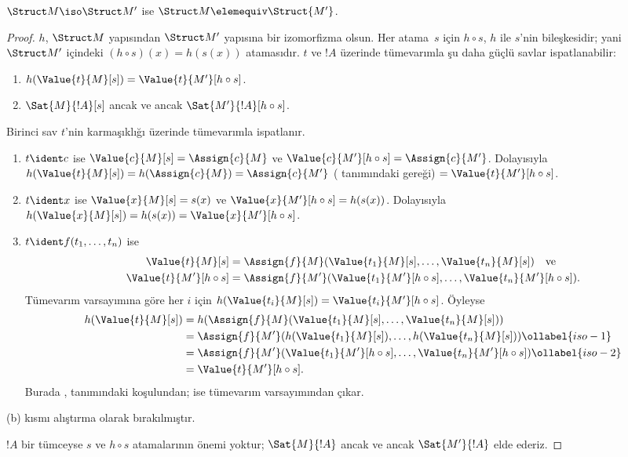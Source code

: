\begin{thm}
$\Struct M\iso\Struct M'$ ise $\Struct M\elemequiv\Struct{M'}$.
\end{thm}

\begin{proof}
$h$, $\Struct M$ yapısından $\Struct M'$ yapısına bir izomorfizma
olsun. Her atama~$s$ için $h\circ s$, $h$ ile $s$'nin bileşkesidir;
yani $\Struct M'$ içindeki $(h\circ s)(x)=h(s(x))$ atamasıdır. $t$ ve
$!A$ üzerinde tümevarımla şu daha güçlü savlar ispatlanabilir:
\begin{enumerate}
  \item[a.] $h(\Value{t}{M}[s]) = \Value{t}{M'}[h\circ s]$.
  \item[b.] $\Sat{M}{!A}[s]$ ancak ve ancak
    $\Sat{M'}{!A}[h\circ s]$.
\end{enumerate}
Birinci sav $t$'nin karmaşıklığı üzerinde tümevarımla ispatlanır.
\begin{enumerate}
\item $t\ident c$ ise $\Value{c}{M}[s]=\Assign{c}{M}$ ve
  $\Value{c}{M'}[h\circ s]=\Assign{c}{M'}$. Dolayısıyla
  $h(\Value{t}{M}[s])=h(\Assign{c}{M})=\Assign{c}{M'}$
  ( tanımındaki 
  gereği) $=\Value{t}{M'}[h\circ s]$.
\item $t\ident x$ ise $\Value{x}{M}[s]=s(x)$ ve
  $\Value{x}{M'}[h\circ s]=h(s(x))$. Dolayısıyla
  $h(\Value{x}{M}[s])=h(s(x))=\Value{x}{M'}[h\circ s]$.
\item $t\ident f(t_1,\dots,t_n)$ ise
  \begin{align*}
    \Value{t}{M}[s] & = \Assign{f}{M}(\Value{t_1}{M}[s], \dots, \Value{t_n}{M}[s])
      \quad\text{ve}\\
  \Value{t}{M'}[h \circ s] & = \Assign{f}{M'}(\Value{t_1}{M'}[h \circ
    s], \dots, \Value{t_n}{M'}[h \circ s]).
  \end{align*}
  Tümevarım varsayımına göre her $i$ için
  $h(\Value{t_i}{M}[s])=\Value{t_i}{M'}[h\circ s]$. Öyleyse
  \begin{align}
    h(\Value{t}{M}[s])
    & = h(\Assign{f}{M}(\Value{t_1}{M}[s], \dots, \Value{t_n}{M}[s])) \notag\\
    & = \Assign{f}{M'}(h(\Value{t_1}{M}[s]), \dots,
    h(\Value{t_n}{M}[s])) \ollabel{iso-1}\\
    & = \Assign{f}{M'}(\Value{t_1}{M'}[h \circ s], \dots,
    \Value{t_n}{M'}[h \circ s]) \ollabel{iso-2}\\
    & = \Value{t}{M'}[h\circ s]. \notag
  \end{align}
  Burada ,  tanımındaki
   koşulundan;  ise tümevarım
  varsayımından çıkar.
\end{enumerate}
(b) kısmı alıştırma olarak bırakılmıştır.

$!A$ bir tümceyse $s$ ve $h\circ s$ atamalarının önemi yoktur;
$\Sat{M}{!A}$ ancak ve ancak $\Sat{M'}{!A}$ elde ederiz.
\end{proof}

